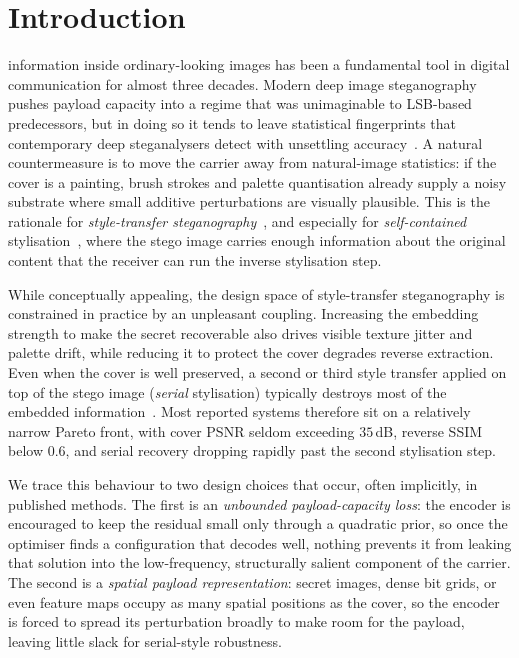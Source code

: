 \documentclass[conference]{IEEEtran}
\begin{document}
\section{Introduction}
 information inside ordinary-looking images has been a fundamental tool in digital communication for almost three decades. Modern deep image steganography pushes payload capacity into a regime that was unimaginable to LSB-based predecessors, but in doing so it tends to leave statistical fingerprints that contemporary deep steganalysers detect with unsettling accuracy~\cite{isn,riis,rmsteg}. A natural countermeasure is to move the carrier away from natural-image statistics: if the cover is a painting, brush strokes and palette quantisation already supply a noisy substrate where small additive perturbations are visually plausible. This is the rationale for \emph{style-transfer steganography}~\cite{wacv2020,stylestegan2023,sstegogan2024,sst2024,ihst2024,css2024,sddpm2025,stisgan2026}, and especially for \emph{self-contained} stylisation~\cite{wacv2020}, where the stego image carries enough information about the original content that the receiver can run the inverse stylisation step.

While conceptually appealing, the design space of style-transfer steganography is constrained in practice by an unpleasant coupling. Increasing the embedding strength to make the secret recoverable also drives visible texture jitter and palette drift, while reducing it to protect the cover degrades reverse extraction. Even when the cover is well preserved, a second or third style transfer applied on top of the stego image (\emph{serial} stylisation) typically destroys most of the embedded information~\cite{wacv2020,stylestegan2023}. Most reported systems therefore sit on a relatively narrow Pareto front, with cover PSNR seldom exceeding $35$\,dB, reverse SSIM below $0.6$, and serial recovery dropping rapidly past the second stylisation step.

We trace this behaviour to two design choices that occur, often implicitly, in published methods. The first is an \emph{unbounded payload-capacity loss}: the encoder is encouraged to keep the residual small only through a quadratic prior, so once the optimiser finds a configuration that decodes well, nothing prevents it from leaking that solution into the low-frequency, structurally salient component of the carrier. The second is a \emph{spatial payload representation}: secret images, dense bit grids, or even feature maps occupy as many spatial positions as the cover, so the encoder is forced to spread its perturbation broadly to make room for the payload, leaving little slack for serial-style robustness.
\end{document}
